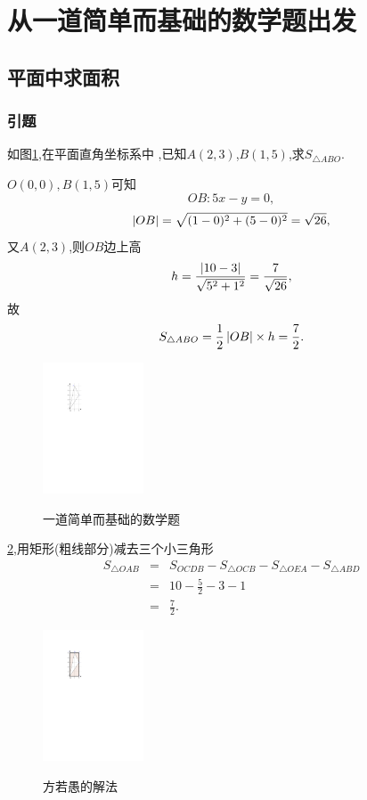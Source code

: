 \section{从一道简单而基础的数学题出发}
\subsection{平面中求面积}
\subsubsection{引题}

  \prob 如图\ref{pro1},在平面直角坐标系中
  ,已知$A(2,3)$,$B(1,5)$,求$S_{\triangle ABO}$.

  $O(0,0),B(1,5)$可知
  $$OB:5x-y=0,$$
  $$\left| {OB} \right|=\sqrt{(1-0)^2+(5-0)^2}=\sqrt{26},$$
  又$A(2,3)$,则$OB$边上高
  $$h=\frac{\left| {10-3} \right|}{\sqrt{5^2+1^2}}=\frac{7}{\sqrt{26}},$$
  故
  $$S_{\triangle ABO}=\frac{1}{2}\left| {OB} \right|\times h=\frac{7}{2}.$$
\solend

  \begin{figure}
    \centering
    \includegraphics[width=3cm]{pic//1//1.pdf}\\
    \caption{一道简单而基础的数学题}\label{pro1}
  \end{figure}

\ref{pro2},用矩形(粗线部分)减去三个小三角形
\begin{eqnarray}
S_{\triangle OAB}
&=&S_{OCDB}-S_{\triangle OCB}-
S_{\triangle OEA}-S_{\triangle ABD} \nonumber\\
&=&10-\frac{5}{2}-3-1\nonumber\\
&=&\frac{7}{2}.\nonumber
\end{eqnarray}
\solend

\begin{figure}
  \centering
  \includegraphics[width=3cm]{pic//1//2.pdf}\\
  \caption{方若愚的解法}\label{pro2}
\end{figure}

